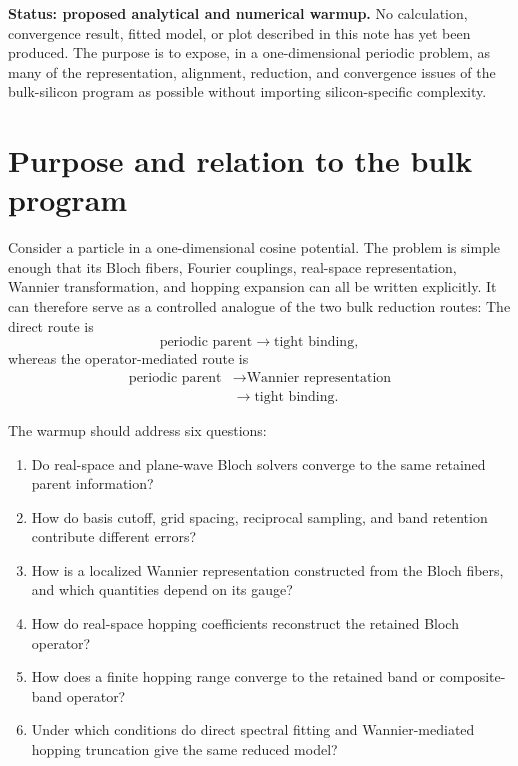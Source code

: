 
\textbf{Status: proposed analytical and numerical warmup.} No calculation,
convergence result, fitted model, or plot described in this note has yet been
produced. The purpose is to expose, in a one-dimensional periodic problem, as
many of the representation, alignment, reduction, and convergence issues of
the bulk-silicon program as possible without importing silicon-specific
complexity.

\section*{Purpose and relation to the bulk program}

Consider a particle in a one-dimensional cosine potential. The problem is
simple enough that its Bloch fibers, Fourier couplings, real-space
representation, Wannier transformation, and hopping expansion can all be
written explicitly. It can therefore serve as a controlled analogue of the two
bulk reduction routes:
The direct route is
\begin{equation}
    \text{periodic parent}
    \longrightarrow
    \text{tight binding},
\end{equation}
whereas the operator-mediated route is
\begin{equation}
    \begin{aligned}
        \text{periodic parent}
        &\longrightarrow
        \text{Wannier representation}
        \\
        &\longrightarrow
        \text{tight binding}.
    \end{aligned}
\end{equation}

The warmup should address six questions:
\begin{enumerate}
    \item Do real-space and plane-wave Bloch solvers converge to the same
          retained parent information?
    \item How do basis cutoff, grid spacing, reciprocal sampling, and band
          retention contribute different errors?
    \item How is a localized Wannier representation constructed from the Bloch
          fibers, and which quantities depend on its gauge?
    \item How do real-space hopping coefficients reconstruct the retained Bloch
          operator?
    \item How does a finite hopping range converge to the retained band or
          composite-band operator?
    \item Under which conditions do direct spectral fitting and
          Wannier-mediated hopping truncation give the same reduced model?
\end{enumerate}


